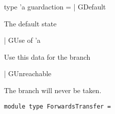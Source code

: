 \documentclass[11pt]{article}
\begin{document}
\label{type:Dataflow.guardaction}\begin{ocamldoccode}
type 'a guardaction =
  | GDefault
\end{ocamldoccode}
\begin{ocamldoccomment}
The default state
\end{ocamldoccomment}
\begin{ocamldoccode}
  | GUse of 'a
\end{ocamldoccode}
\begin{ocamldoccomment}
Use this data for the branch
\end{ocamldoccomment}
\begin{ocamldoccode}
  | GUnreachable
\end{ocamldoccode}
\begin{ocamldoccomment}
The branch will never be taken.
\end{ocamldoccomment}




\begin{ocamldoccode}
{\tt{module type }}{\tt{ForwardsTransfer}}{\tt{ = }}\end{ocamldoccode}
\label{moduletype:Dataflow.ForwardsTransfer}
\end{document}
